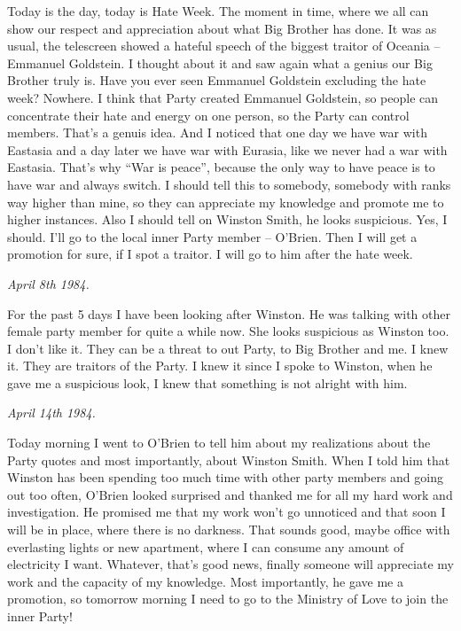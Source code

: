 \documentclass[12pt,a4paper]{article}
\begin{document}
Today is the day, today is Hate Week. The moment in time, where we all can show our respect and appreciation about what Big Brother has done. It was as usual, the telescreen showed a hateful speech of the biggest traitor of Oceania – Emmanuel Goldstein. I thought about it and saw again what a genius our Big Brother truly is. Have you ever seen Emmanuel Goldstein excluding the hate week? Nowhere. I think that Party created Emmanuel Goldstein, so people can concentrate their hate and energy on one person, so the Party can control members. That's a genuis idea. And I noticed that one day we have war with Eastasia and a day later we have war with Eurasia, like we never had a war with Eastasia. That's why “War is peace”, because the only way to have peace is to have war and always switch. I should tell this to somebody, somebody with ranks way higher than mine, so they can appreciate my knowledge and promote me to higher instances. Also I should tell on Winston Smith, he looks suspicious. Yes, I should. I'll go to the local inner Party member – O'Brien.  Then I will get a promotion for sure, if I spot a traitor. I will go to him after the hate week.\\

\begin{flushleft}
  \textit{April 8th 1984.}
  \end{flushleft}

For the past 5 days I have been looking after Winston. He was talking with other female party member for quite a while now.  She looks suspicious as Winston too. I don't like it. They can be a threat to out Party, to Big Brother and me. I knew it. They are traitors of the Party. I knew it since I spoke to Winston, when he gave me a suspicious look, I knew that something is not alright with him.\\

\begin{flushleft}
  \textit{April 14th 1984.}
  \end{flushleft}

Today morning I went to O'Brien to tell him about my realizations about the Party quotes and most importantly, about Winston Smith. When I told him that Winston has been spending too much time with other party members and going out too often, O'Brien looked surprised and thanked me for all my hard work and investigation. He promised me that my work won't go unnoticed and that soon I will be in place, where there is no darkness. That sounds good, maybe office with everlasting lights or new apartment, where I can consume any amount of electricity I want. Whatever, that's good news, finally someone will appreciate my work and the capacity of my knowledge. Most importantly, he gave me a promotion, so tomorrow morning I need to go to the Ministry of Love to join the inner Party!  \\

  
\end{document}
